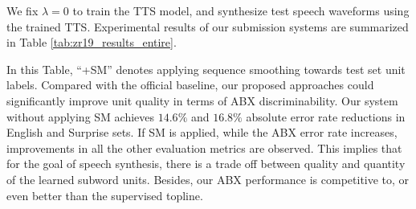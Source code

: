 \documentclass[a4paper]{article}
\begin{document}
We fix $\lambda=0$ to  train the TTS model, and synthesize test speech waveforms using the trained TTS.
Experimental results of our submission systems are summarized in Table \ref{tab:zr19_results_entire}. 
\begin{table}[t]
\renewcommand\arraystretch{0.89}
\centering
\caption{Comparison of baseline, topline and our submission}
\label{tab:zr19_results_entire}
\end{table}
In this Table, ``+SM'' denotes applying sequence smoothing   towards test set unit labels. Compared with the official baseline, our proposed approaches could significantly improve  unit quality in terms of ABX discriminability. Our system without applying SM achieves $14.6\%$ and $16.8\%$ absolute error rate reductions in English and Surprise sets. If SM is applied, while the ABX error rate increases, improvements in all the other evaluation metrics are observed.
This implies that for the goal of speech synthesis, there is a trade off between quality and quantity of the  learned subword units. Besides, our ABX performance is competitive to, or even better than the supervised topline.
\end{document}
